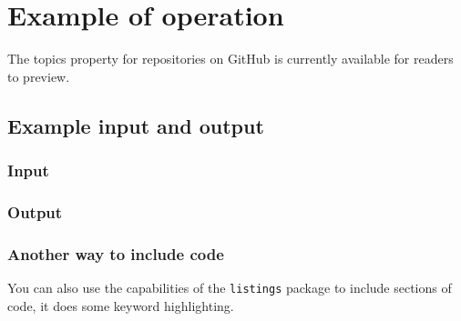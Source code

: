 \chapter{Example of operation}

The topics property for repositories on GitHub is currently available for readers to preview.

\section{Example input and output}
\label{sec:inp-eg}
\subsection{Input}
\label{sec:input}
{\fontsize{6pt}{6pt}\selectfont 

}

\subsection{Output}
\label{sec:output}


\subsection{Another way to include code}
You can also use the capabilities of the \texttt{listings} package to
include sections of code, it does some keyword highlighting.



